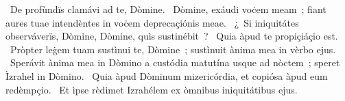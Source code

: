 \psalmChapterWithInscription{}
{ }
{%
~De profùndïs clamávi ad te, Dòmine. 
~Dòmine, exáudi voċem meam~; fiant aures tuae intendèntes in voċem deprecaçiónis meae. 
~¿~Si iniquitátes observáverïs, Dòmine, Dòmine, quìs sustinébit~? 
~Quia àpud te propiçiáçio est. 
~Pròpter leġem tuam sustìnui te, Dòmine~; sustìnuit ànima mea in vèrbo ejus. 
~Sperávit ànima mea in Dòmino a custódia matutína usque ad nòctem~; speret Ìzrahel in Dòmino. 
~Quia àpud Dòminum mizericórdia, et copiósa àpud eum redèmpçio. 
~Et ìpse rèdimet Izrahélem ex òmnibus iniquitátibus ejus. 
}
